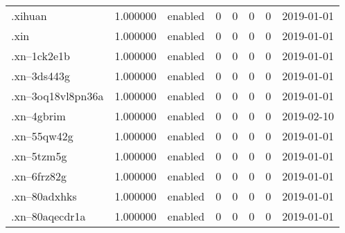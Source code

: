 \begin{tabular}{lrlrrrrl}
.xihuan                   &          1.000000 &         enabled &                           0 &                           0 &                           0 &                   0 &           2019-01-01 \\
.xin                      &          1.000000 &         enabled &                           0 &                           0 &                           0 &                   0 &           2019-01-01 \\
.xn--1ck2e1b              &          1.000000 &         enabled &                           0 &                           0 &                           0 &                   0 &           2019-01-01 \\
.xn--3ds443g              &          1.000000 &         enabled &                           0 &                           0 &                           0 &                   0 &           2019-01-01 \\
.xn--3oq18vl8pn36a        &          1.000000 &         enabled &                           0 &                           0 &                           0 &                   0 &           2019-01-01 \\
.xn--4gbrim               &          1.000000 &         enabled &                           0 &                           0 &                           0 &                   0 &           2019-02-10 \\
.xn--55qw42g              &          1.000000 &         enabled &                           0 &                           0 &                           0 &                   0 &           2019-01-01 \\
.xn--5tzm5g               &          1.000000 &         enabled &                           0 &                           0 &                           0 &                   0 &           2019-01-01 \\
.xn--6frz82g              &          1.000000 &         enabled &                           0 &                           0 &                           0 &                   0 &           2019-01-01 \\
.xn--80adxhks             &          1.000000 &         enabled &                           0 &                           0 &                           0 &                   0 &           2019-01-01 \\
.xn--80aqecdr1a           &          1.000000 &         enabled &                           0 &                           0 &                           0 &                   0 &           2019-01-01 \\

\end{tabular}
